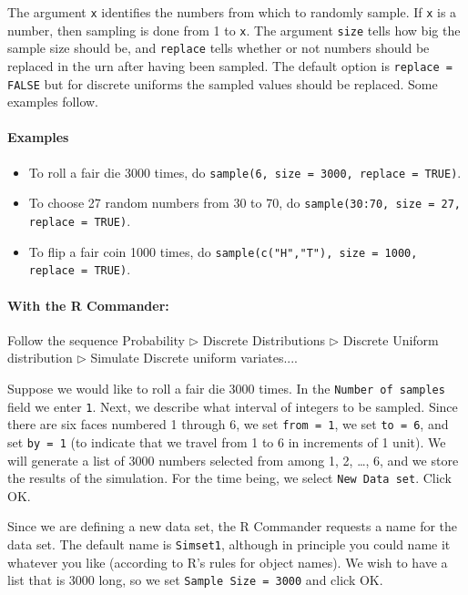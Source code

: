 \documentclass[captions=tableheading]{scrbook}
\begin{document}
The argument \texttt{x} identifies the numbers from which to randomly sample. If \texttt{x} is a number, then sampling is done from 1 to \texttt{x}. The argument \texttt{size} tells how big the sample size should be, and \texttt{replace} tells whether or not numbers should be replaced in the urn after having been sampled. The default option is \texttt{replace = FALSE} but for discrete uniforms the sampled values should be replaced. Some examples follow.

\paragraph*{Examples}
\begin{itemize}
\item To roll a fair die 3000 times, do \texttt{sample(6, size = 3000, replace = TRUE)}.
\item To choose 27 random numbers from 30 to 70, do \texttt{sample(30:70, size = 27, replace = TRUE)}.
\item To flip a fair coin 1000 times, do \texttt{sample(c("H","T"), size = 1000, replace = TRUE)}.
\end{itemize}

\paragraph*{With the \textsf{R} Commander:}

Follow the sequence \textsf{Probability \(\triangleright\) Discrete Distributions \(\triangleright\) Discrete Uniform distribution \(\triangleright\) Simulate Discrete uniform variates.}...

Suppose we would like to roll a fair die 3000 times. In the \texttt{Number of samples} field we enter \texttt{1}. Next, we describe what interval of integers to be sampled. Since there are six faces numbered 1 through 6, we set \texttt{from = 1}, we set \texttt{to = 6}, and set \texttt{by = 1} (to indicate that we travel from 1 to 6 in increments of 1 unit). We will generate a list of 3000 numbers selected from among 1, 2, \ldots{}, 6, and we store the results of the simulation. For the time being, we select \texttt{New Data set}. Click \textsf{OK}.

Since we are defining a new data set, the \textsf{R} Commander requests a name for the data set. The default name is \texttt{Simset1}, although in principle you could name it whatever you like (according to \textsf{R}'s rules for object names). We wish to have a list that is 3000 long, so we set \texttt{Sample Size = 3000} and click \textsf{OK}.
\end{document}
